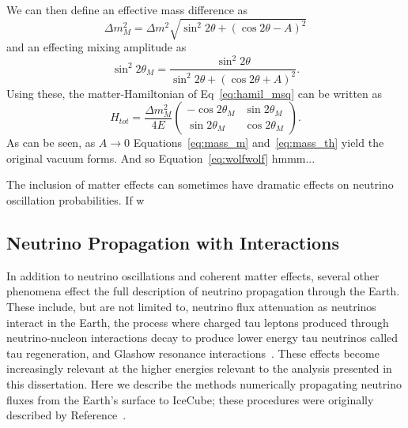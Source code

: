 \documentclass[main.tex]{subfiles}
\begin{document}
We can then define an effective mass difference as 
\begin{equation}\label{eq:mass_m}
    \Delta m_{M}^{2} = \Delta m^{2}\sqrt{\sin^{2}2\theta + (\cos 2\theta - A)^{2}}
\end{equation}
and an effecting mixing amplitude as 
\begin{equation}\label{eq:mass_th}
    \sin^{2} 2\theta_{M} = \dfrac{\sin^{2} 2\theta}{\sin^{2} 2\theta + (\cos 2\theta + A)^{2}}.
\end{equation}
Using these, the matter-Hamiltonian of Eq~\eqref{eq:hamil_msq} can be written as 
\begin{equation}\label{eq:wolfwolf}
    H_{tot} = \dfrac{\Delta m_{M}^{2}}{4E}\left(\begin{array}{cc} -\cos 2\theta_{M} & \sin 2\theta_{M} \\ \sin 2\theta_{M} & \cos 2\theta_{M} \end{array} \right).
\end{equation}
As can be seen, as $A\to 0$ Equations~\ref{eq:mass_m} and~\ref{eq:mass_th} yield the original vacuum forms. And so Equation~\ref{eq:wolfwolf} hmmm... 

The inclusion of matter effects can sometimes have dramatic effects on neutrino oscillation probabilities. If w

\subsection{Neutrino Propagation with Interactions}
In addition to neutrino oscillations and coherent matter effects, several other phenomena effect the full description of neutrino propagation through the Earth. 
These include, but are not limited to, neutrino flux attenuation as neutrinos interact in the Earth, the process where charged tau leptons produced through neutrino-nucleon interactions decay to produce lower energy tau neutrinos called tau regeneration, and Glashow resonance interactions~\cite{PhysRev.118.316}.
These effects become increasingly relevant at the higher energies relevant to the analysis presented in this dissertation.  
Here we describe the methods numerically propagating neutrino fluxes from the Earth's surface to IceCube; these procedures were originally described by Reference~\cite{arguelles2021nusquids}.
\end{document}
